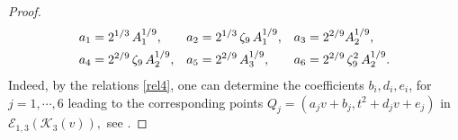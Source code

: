 \documentclass[11pt]{amsart}
\newcommand{\Ee}{{\mathcal E}}
\newcommand{\KK}{{\mathcal K}}
\numberwithin{equation}{section}
\numberwithin{table}{section}
\newcommand\<{\langle}
\begin{document}
\begin{proof}
	
		\begin{align*}
		a_1& =  2^{1/3} \, A_1^{1/9}, & 
		a_2& =  2^{1/3} \, \zeta_9 \, A_1^{1/9}, & 	a_3 &=   2^{2/9} A_2^{1/9},\notag \\
		a_4& =  2^{2/9}\,  \zeta_9 \,  A_2^{1/9},& 
		a_5 &=2^{2/9}\, A_3^{1/9}, &  	a_6&=    2^{2/9} \, \zeta_9^2  \, A_2^{1/9}.	
	\end{align*}
% 
	Indeed, by the relations \eqref{rel4}, one can determine the coefficients $b_i, d_i, e_i$, for $j=1,\cdots, 6$ leading to the 
	corresponding points $Q_j=(a_j v+ b_j, t^2 + d_j v + e_j)$ in $\Ee_{1,3}(\KK_3(v)),$ 
	see \cite[Points3]{Shioda360-Codes}.
	

\end{proof}
\end{document}
